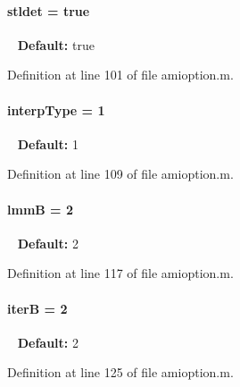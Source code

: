 \hypertarget{classamioption_a202e02f7d8c1a87b1c675bcc1acf1c8e}{}
\paragraph[{stldet}]{\setlength{\rightskip}{0pt plus 5cm}stldet = true}\label{classamioption_a202e02f7d8c1a87b1c675bcc1acf1c8e}
~\newline
{\bfseries Default\+:} true 

Definition at line 101 of file amioption.\+m.

\hypertarget{classamioption_ad06cc805fa18b06ac937fd98a9eba0e7}{}
\paragraph[{interp\+Type}]{\setlength{\rightskip}{0pt plus 5cm}interp\+Type = 1}\label{classamioption_ad06cc805fa18b06ac937fd98a9eba0e7}
~\newline
{\bfseries Default\+:} 1 

Definition at line 109 of file amioption.\+m.

\hypertarget{classamioption_afbc60e75d11740bf27f5a7fc5706fd44}{}
\paragraph[{lmm\+B}]{\setlength{\rightskip}{0pt plus 5cm}lmm\+B = 2}\label{classamioption_afbc60e75d11740bf27f5a7fc5706fd44}
~\newline
{\bfseries Default\+:} 2 

Definition at line 117 of file amioption.\+m.

\hypertarget{classamioption_ae6a49cec21ffe790217be29b0fced832}{}
\paragraph[{iter\+B}]{\setlength{\rightskip}{0pt plus 5cm}iter\+B = 2}\label{classamioption_ae6a49cec21ffe790217be29b0fced832}
~\newline
{\bfseries Default\+:} 2 

Definition at line 125 of file amioption.\+m.

